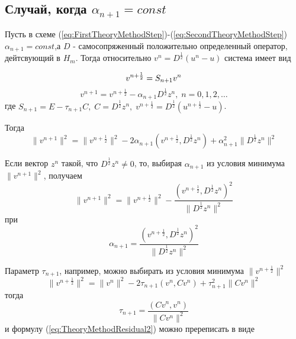 \addtocounter{subsection}{1}
\subsection*{Случай, когда $\alpha_{n+1}=const$}

Пусть в схеме (\ref{eq:FirstTheoryMethodStep})-(\ref{eq:SecondTheoryMethodStep}) $\alpha_{n+1}=const$,а $D$ - самосопряженный положительно определенный оператор, дейтсвующий в $H_m$. Тогда относительно $v^n=D^{\frac{1}{2}}(u^n-u)$ система имеет вид

\begin{equation}
    \label{eq:FirstTheoryMethodStepResidual}
    v^{n+\frac{1}{2}}=S_{n+1}v^n\\
\end{equation}
\begin{equation}
    \label{eq:SecondTheoryMethodStepResidual}
    v^{n+1}=v^{n+\frac{1}{2}}-\alpha_{n+1}D^{\frac{1}{2}}z^n,\;n=0,1,2,\ldots
\end{equation}
где $S_{n+1}=E-\tau_{n+1}C,\; C=D^{\frac{1}{2}}z^n,\; v^{n+\frac{1}{2}}=D^{\frac{1}{2}}(u^{n+\frac{1}{2}}-u)$.

Тогда 
\begin{equation}
    \label{eq:TheoryMethodResidual1}
    \|v^{n+1}\|^2=\|v^{n+\frac{1}{2}}\|^2-2\alpha_{n+1}(v^{n+\frac{1}{2}},D^{\frac{1}{2}}z^n)+\alpha^2_{n+1}\|D^{\frac{1}{2}}z^n\|^2
\end{equation}

Если вектор $z^n$ такой, что $D^{\frac{1}{2}}z^n\neq 0$, то, выбирая $\alpha_{n+1}$ из условия минимума $\|v^{n+1}\|^2$, получаем
\begin{equation}
    \label{eq:TheoryMethodResidual2}
    \|v^{n+1}\|^2=\|v^{n+\frac{1}{2}}\|^2-\frac{(v^{n+\frac{1}{2}},D^{\frac{1}{2}}z^n)^2}{\|D^{\frac{1}{2}}z^n\|^2}
\end{equation}
при
\begin{equation}
    \label{eq:TheoryMethodAlpha}
    \alpha_{n+1}=\frac{(v^{n+\frac{1}{2}},D^{\frac{1}{2}}z^n)^2}{\|D^{\frac{1}{2}}z^n\|^2}
\end{equation}

Параметр $\tau_{n+1}$, например, можно выбирать из условия минимума $\|v^{n+\frac{1}{2}}\|^2$
\begin{equation}
    \label{eq:TheoryMethodResidual3}
    \|v^{n+\frac{1}{2}}\|^2=\|v^{n}\|^2-2\tau_{n+1}(v^{n},Cv^n)+\tau^2_{n+1}\|Cv^n\|^2
\end{equation}
тогда
\begin{equation}
    \label{eq:TheoryMethodTau}
    \tau_{n+1}=\frac{(Cv^{n},v^n)}{\|Cv^n\|^2}
\end{equation}
и формулу (\ref{eq:TheoryMethodResidual2}) можно пререписать в виде

